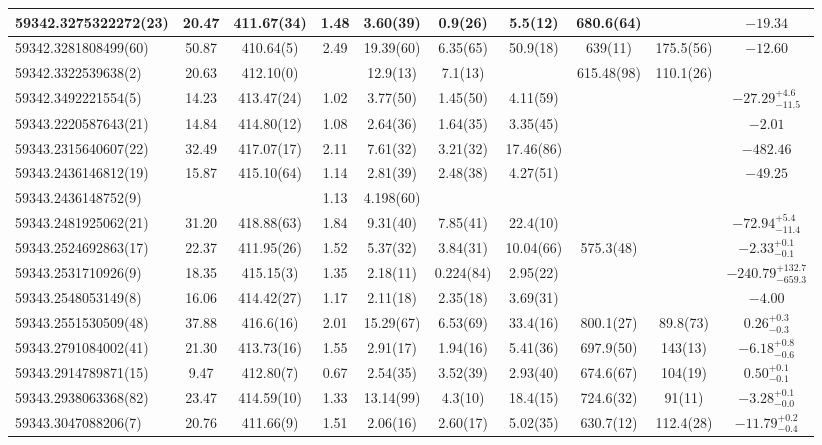 {{\begin{longtable}{lccccccccc}
\hline
59342.3275322272(23) & 20.47 & 411.67(34) & 1.48 & 3.60(39) & 0.9(26)  & 5.5(12) & 680.6(64) &  & $-19.34$ \\
\hline
59342.3281808499(60) & 50.87 & 410.64(5) & 2.49 & 19.39(60) & 6.35(65)  & 50.9(18) & 639(11) & 175.5(56) & $-12.60$ \\
\hline
59342.3322539638(2) & 20.63 & 412.10(0) &  & 12.9(13) & 7.1(13)  &  & 615.48(98) & 110.1(26) &  \\
\hline
59342.3492221554(5) & 14.23 & 413.47(24) & 1.02 & 3.77(50) & 1.45(50)  & 4.11(59) &  &  & $-27.29^{+4.6}_{-11.5}$ \\
\hline
59343.2220587643(21) & 14.84 & 414.80(12) & 1.08 & 2.64(36) & 1.64(35)  & 3.35(45) &  &  & $-2.01$ \\
\hline
59343.2315640607(22) & 32.49 & 417.07(17) & 2.11 & 7.61(32) & 3.21(32)  & 17.46(86) &  &  & $-482.46$ \\
\hline
59343.2436146812(19) & 15.87 & 415.10(64) & 1.14 & 2.81(39) & 2.48(38)  & 4.27(51) &  &  & $-49.25$ \\
59343.2436148752(9) &  &  & 1.13 & 4.198(60) &   &  &  &  &  \\
\hline
59343.2481925062(21) & 31.20 & 418.88(63) & 1.84 & 9.31(40) & 7.85(41)  & 22.4(10) &  &  & $-72.94^{+5.4}_{-11.4}$ \\
\hline
59343.2524692863(17) & 22.37 & 411.95(26) & 1.52 & 5.37(32) & 3.84(31)  & 10.04(66) & 575.3(48) &  & $-2.33^{+0.1}_{-0.1}$ \\
\hline
59343.2531710926(9) & 18.35 & 415.15(3) & 1.35 & 2.18(11) & 0.224(84)  & 2.95(22) &  &  & $-240.79^{+132.7}_{-659.3}$ \\
\hline
59343.2548053149(8) & 16.06 & 414.42(27) & 1.17 & 2.11(18) & 2.35(18)  & 3.69(31) &  &  & $-4.00$ \\
\hline
59343.2551530509(48) & 37.88 & 416.6(16) & 2.01 & 15.29(67) & 6.53(69)  & 33.4(16) & 800.1(27) & 89.8(73) & $0.26^{+0.3}_{-0.3}$ \\
\hline
59343.2791084002(41) & 21.30 & 413.73(16) & 1.55 & 2.91(17) & 1.94(16)  & 5.41(36) & 697.9(50) & 143(13) & $-6.18^{+0.8}_{-0.6}$ \\
\hline
59343.2914789871(15) & 9.47 & 412.80(7) & 0.67 & 2.54(35) & 3.52(39)  & 2.93(40) & 674.6(67) & 104(19) & $0.50^{+0.1}_{-0.1}$ \\
\hline
59343.2938063368(82) & 23.47 & 414.59(10) & 1.33 & 13.14(99) & 4.3(10)  & 18.4(15) & 724.6(32) & 91(11) & $-3.28^{+0.1}_{-0.0}$ \\
\hline
59343.3047088206(7) & 20.76 & 411.66(9) & 1.51 & 2.06(16) & 2.60(17)  & 5.02(35) & 630.7(12) & 112.4(28) & $-11.79^{+0.2}_{-0.4}$ \\

\end{longtable}}}
